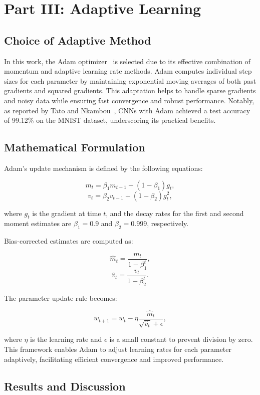 \section{Part III: Adaptive Learning}

\subsection{Choice of Adaptive Method}
In this work, the Adam optimizer~\cite{kingma2014adam} is selected due to its effective combination of momentum and adaptive learning rate methods. Adam computes individual step sizes for each parameter by maintaining exponential moving averages of both past gradients and squared gradients. This adaptation helps to handle sparse gradients and noisy data while ensuring fast convergence and robust performance. Notably, as reported by Tato and Nkambou~\cite{tato2018improving}, CNNs with Adam achieved a test accuracy of 99.12\% on the MNIST dataset, underscoring its practical benefits.

\subsection{Mathematical Formulation}
Adam's update mechanism is defined by the following equations:

\[
    m_t = \beta_1 m_{t-1} + (1 - \beta_1) g_t,
\]
\[
    v_t = \beta_2 v_{t-1} + (1 - \beta_2) g_t^2,
\]

where \(g_t\) is the gradient at time \(t\), and the decay rates for the first and second moment estimates are \(\beta_1 = 0.9\) and \(\beta_2 = 0.999\), respectively.

Bias-corrected estimates are computed as:

\[
    \hat{m}_t = \frac{m_t}{1 - \beta_1^t},
\]
\[
    \hat{v}_t = \frac{v_t}{1 - \beta_2^t}.
\]

The parameter update rule becomes:

\[
    w_{t+1} = w_t - \eta \frac{\hat{m}_t}{\sqrt{\hat{v}_t} + \epsilon},
\]

where \( \eta \) is the learning rate and \( \epsilon \) is a small constant to prevent division by zero. This framework enables Adam to adjust learning rates for each parameter adaptively, facilitating efficient convergence and improved performance.

\subsection{Results and Discussion}

